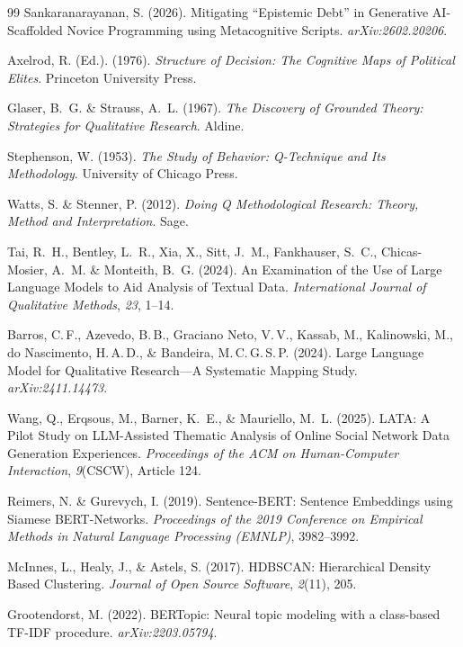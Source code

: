 \documentclass[11pt,a4paper]{article}
\theoremstyle{definition}
\theoremstyle{plain}
\theoremstyle{remark}
\begin{document}
\begin{thebibliography}{99}
  Sankaranarayanan, S. (2026).
  Mitigating ``Epistemic Debt'' in Generative AI-Scaffolded Novice Programming using Metacognitive Scripts.
  \textit{arXiv:2602.20206}.

  Axelrod, R. (Ed.). (1976).
  \textit{Structure of Decision: The Cognitive Maps of Political Elites}.
  Princeton University Press.

  Glaser, B.~G. \& Strauss, A.~L. (1967).
  \textit{The Discovery of Grounded Theory: Strategies for Qualitative Research}.
  Aldine.

  Stephenson, W. (1953).
  \textit{The Study of Behavior: Q-Technique and Its Methodology}.
  University of Chicago Press.

  Watts, S. \& Stenner, P. (2012).
  \textit{Doing Q Methodological Research: Theory, Method and Interpretation}.
  Sage.

  Tai, R.~H., Bentley, L.~R., Xia, X., Sitt, J.~M., Fankhauser, S.~C., Chicas-Mosier, A.~M. \& Monteith, B.~G. (2024).
  An Examination of the Use of Large Language Models to Aid Analysis of Textual Data.
  \textit{International Journal of Qualitative Methods}, \textit{23}, 1--14.

  Barros, C.\,F., Azevedo, B.\,B., Graciano Neto, V.\,V., Kassab, M., Kalinowski, M., do Nascimento, H.\,A.\,D., \& Bandeira, M.\,C.\,G.\,S.\,P. (2024).
  Large Language Model for Qualitative Research---A Systematic Mapping Study.
  \textit{arXiv:2411.14473}.

  Wang, Q., Erqsous, M., Barner, K.~E., \& Mauriello, M.~L. (2025).
  LATA: A Pilot Study on LLM-Assisted Thematic Analysis of Online Social Network Data Generation Experiences.
  \textit{Proceedings of the ACM on Human-Computer Interaction}, \textit{9}(CSCW), Article 124.

  Reimers, N. \& Gurevych, I. (2019).
  Sentence-BERT: Sentence Embeddings using Siamese BERT-Networks.
  \textit{Proceedings of the 2019 Conference on Empirical Methods in Natural Language Processing (EMNLP)}, 3982--3992.

  McInnes, L., Healy, J., \& Astels, S. (2017).
  HDBSCAN: Hierarchical Density Based Clustering.
  \textit{Journal of Open Source Software}, \textit{2}(11), 205.

  Grootendorst, M. (2022).
  BERTopic: Neural topic modeling with a class-based TF-IDF procedure.
  \textit{arXiv:2203.05794}.

\end{thebibliography}
\end{document}
